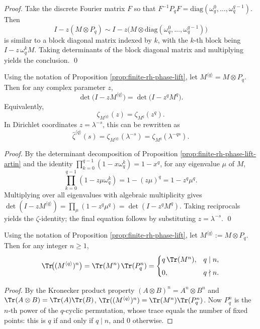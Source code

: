 \begin{proof}
Take the discrete Fourier matrix \(F\) so that \(F^{-1}P_qF=\mathrm{diag}(\omega_q^0,\dots,\omega_q^{q-1})\).
Then
\[
I-z(M\otimes P_q)
\sim
I-z\bigl(M\otimes \mathrm{diag}(\omega_q^0,\dots,\omega_q^{q-1})\bigr)
\]
is similar to a block diagonal matrix indexed by \(k\), with the \(k\)-th block being \(I-z\,\omega_q^k M\). Taking determinants of the block diagonal matrix and multiplying yields the conclusion. \qed
\end{proof}

\begin{corollary}\label{cor:finite-rh-phase-lift-time-rescale}
Using the notation of Proposition \ref{prop:finite-rh-phase-lift}, let \(M^{\langle q\rangle}=M\otimes P_q\).
Then for any complex parameter \(z\),
\[
\det\!\bigl(I-zM^{\langle q\rangle}\bigr)=\det\!\bigl(I-z^q M^q\bigr).
\]
Equivalently,
\[
\zeta_{M^{\langle q\rangle}}(z)=\zeta_{M^q}(z^q).
\]
In Dirichlet coordinates \(z=\lambda^{-s}\), this can be rewritten as
\[
\widehat{\zeta}^{\langle q\rangle}(s)
=\zeta_{M^{\langle q\rangle}}(\lambda^{-s})
=\zeta_{M^q}(\lambda^{-qs}).
\]
\end{corollary}

\begin{proof}
By the determinant decomposition of Proposition \ref{prop:finite-rh-phase-lift-artin} and the identity
\(
\prod_{k=0}^{q-1}(1-x\omega_q^k)=1-x^q
\), for any eigenvalue \(\mu\) of \(M\),
\[
\prod_{k=0}^{q-1}(1-z\mu\omega_q^k)=1-(z\mu)^q=1-z^q\mu^q.
\]
Multiplying over all eigenvalues with algebraic multiplicity gives
\(
\det(I-zM^{\langle q\rangle})=\prod_{\mu}(1-z^q\mu^q)=\det(I-z^qM^q)
\).
Taking reciprocals yields the \(\zeta\)-identity; the final equation follows by substituting \(z=\lambda^{-s}\). \qed
\end{proof}

\begin{corollary}\label{cor:finite-rh-phase-lift-trace-filter}
Using the notation of Proposition \ref{prop:finite-rh-phase-lift}, let \(M^{\langle q\rangle}:=M\otimes P_q\).
Then for any integer \(n\ge 1\),
\[
\Tr\!\bigl((M^{\langle q\rangle})^{n}\bigr)
=\Tr(M^n)\,\Tr(P_q^n)
=
\begin{cases}
q\,\Tr(M^n), & q\mid n,\\[4pt]
0, & q\nmid n.
\end{cases}
\]
\end{corollary}
\begin{proof}
By the Kronecker product property \((A\otimes B)^n=A^n\otimes B^n\) and \(\Tr(A\otimes B)=\Tr(A)\Tr(B)\),
\(\Tr((M^{\langle q\rangle})^n)=\Tr(M^n)\Tr(P_q^n)\).
Now \(P_q^n\) is the \(n\)-th power of the \(q\)-cyclic permutation, whose trace equals the number of fixed points: this is \(q\) if and only if \(q\mid n\), and \(0\) otherwise.
\end{proof}


